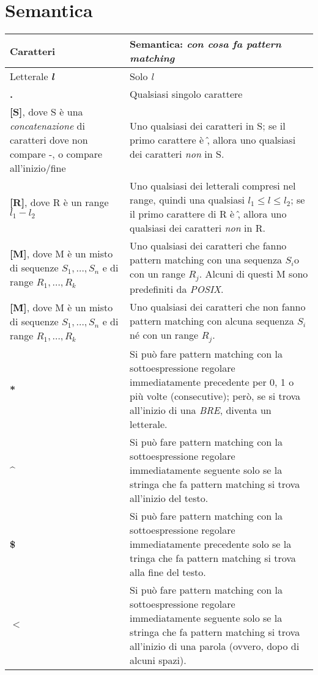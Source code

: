 \section{Semantica}
\begin{center}
	 \label{tab:table-bre} 
	\begin{tabular}{|p{3cm}|p{10cm}|}
	\hline
		\textbf{Caratteri} & \textbf{Semantica: \textit{con cosa fa pattern matching}} \\ \hline
		Letterale \textit{\textbf{l}}	& Solo \textit{l} \\ \hline
		\textbf{.}			& Qualsiasi singolo carattere \\ \hline
		\textbf{[S]}, dove S è una \textit{concatenazione} di caratteri dove non compare -, o compare all'inizio/fine	& Uno qualsiasi dei caratteri in S; se il primo carattere è \^, allora uno qualsiasi dei caratteri \textit{non} in S. \\ \hline
		\textbf{[R]}, dove R è un range $ l_{1} - l_{2} $	& Uno qualsiasi dei letterali compresi nel range, quindi una qualsiasi $ l_{1} \leq l \leq l_{2} $; se il primo carattere di R è \^, allora uno qualsiasi dei caratteri \textit{non} in R. \\ \hline
		\textbf{[M]}, dove M è un misto di sequenze $ S_{1},\ldots,S_{n} $ e di range $ R_{1},\ldots,R_{k} $   & Uno qualsiasi dei caratteri che fanno pattern matching con una sequenza $ S_{i} $o con un range $ R_{j} $. Alcuni di questi M sono predefiniti da \textit{POSIX}. \\ \hline
		\textbf{[\^M]}, dove M è un misto di sequenze $ S_{1},\ldots,S_{n} $ e di range $ R_{1},\ldots,R_{k} $  & Uno qualsiasi dei caratteri che non fanno pattern matching con alcuna sequenza $ S_{i} $ né con un range $ R_{j} $. \\ \hline
		\textbf{*}			& Si può fare pattern matching con la sottoespressione regolare immediatamente precedente per 0, 1 o più volte (consecutive); però, se si trova all'inizio di una \textit{BRE}, diventa un letterale. \\ \hline
		\textbf{\^}		& Si può fare pattern matching con la sottoespressione regolare immediatamente seguente solo se la stringa che fa pattern matching si trova all'inizio del testo. \\ \hline
		\textbf{\$}			& Si può fare pattern matching con la sottoespressione regolare immediatamente precedente solo se la tringa che fa pattern matching si trova alla fine del testo. \\ \hline
		\textbf{$<$}			& Si può fare pattern matching con la sottoespressione regolare immediatamente seguente solo se la stringa che fa pattern matching si trova all'inizio di una parola (ovvero, dopo di alcuni spazi). \\ \hline

\end{tabular}
\end{center}
